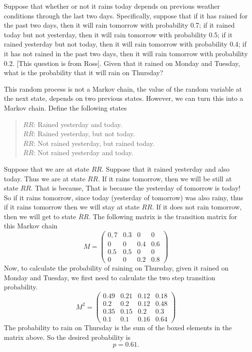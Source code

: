 \begin{problem}
	Suppose that whether or not it rains today depends on previous weather conditions through the last two days. Specifically, suppose that if it has rained for the past two days, then it will rain tomorrow with probability 0.7; if it rained today but not yesterday, then it will rain tomorrow with probability 0.5; if it rained yesterday but not today, then it will rain tomorrow with probability 0.4; if it has not rained in the past two days, then it will rain tomorrow with probability 0.2. [This question is from Ross]. Given that it rained on Monday and Tuesday, what is the probability that it will rain on Thursday?
\end{problem}
\begin{solution}
	This random process is not a Markov chain, the value of the random variable at the next state, depends on two previous states. However, we can turn this into a Markov chain. Define the following states
	\begin{quote}
		$RR$: Rained yesterday and today.\\
		$R\overline{R}$: Rained yesterday, but not today.\\
		$\overline{R}R$: Not rained yesterday, but rained today.\\
		$\overline{R}\overline{R}$: Not rained yesterday and today.
	\end{quote}
	Suppose that we are at state $RR$. Suppose that it rained yesterday and also today. Thus we are at state $RR$. If it rains tomorrow, then we will be still at state $RR$. That is because, That is because the yesterday of tomorrow is today! So if it rains tomorrow, since today (yesterday of tomorrow) was also rainy, thus if it rains tomorrow then we will stay at state $RR$. If it does not rain tomorrow, then we will get to state $\overline{R}R$. The following matrix is the transition matrix for this Markov chain
	\[M = \begin{pmatrix}
		0,7 & 0.3 & 0 & 0 \\
		0 & 0 & 0.4 & 0.6 \\
		0.5 & 0.5 & 0 & 0 \\
		0 & 0 & 0.2 & 0.8
	\end{pmatrix}\]
	Now, to calculate the probability of raining on Thursday, given it rained on Monday and Tuesday, we first need to calculate the two step transition probability.
	\[
	M^2 = \begin{pmatrix}
		\boxed{0.49} & 0.21 & \boxed{0.12} & 0.18 \\
		0.2  & 0.2  & 0.12 & 0.48 \\
		0.35 & 0.15 & 0.2  & 0.3  \\
		0.1  & 0.1  & 0.16 & 0.64
	\end{pmatrix}
	\]
	The probability to rain on Thursday is the sum of the boxed elements in the matrix above. So the desired probability is 
	\[ p = 0.61. \]
\end{solution}



